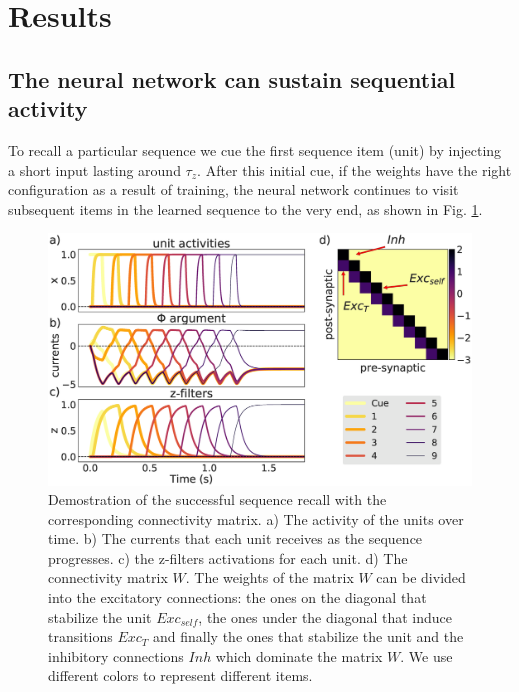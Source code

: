 \documentclass[a4paper]{esannV2}
\begin{document}
\section{Results}

\subsection{The neural network can sustain sequential activity}

To recall a particular sequence we cue the first sequence item (unit) by injecting a short input lasting around $\tau_z$. After this initial cue, if the weights have the right configuration as a result of training, the neural network continues to visit subsequent items in the learned sequence to the very
end, as shown in Fig. \ref{Fig:recall}. 


\begin{figure}[h!]
\centering
\includegraphics[scale=0.20]{recall.eps}
\caption{Demostration of the successful sequence recall with the corresponding connectivity matrix. a) The activity of the units over time. b) The currents that each unit receives as the sequence progresses. c) the z-filters activations for each unit. d) The connectivity matrix $W$. The weights of the matrix $W$ can be divided into the excitatory connections: the ones on the diagonal that stabilize the unit $Exc_{self}$, the ones under the diagonal that induce transitions $Exc_{T}$ and finally the ones that stabilize the unit  and the inhibitory connections $Inh$ which dominate the matrix $W$. We use different colors to represent different items. }\label{Fig:recall}
\end{figure}
\end{document}
